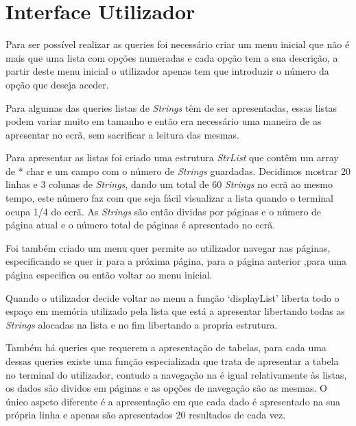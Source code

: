 \documentclass[10pt] {article}
\begin{document}
\section{Interface Utilizador}
\par Para ser possível realizar as queries foi necessário criar um menu inicial que não é mais que uma lista
com opções numeradas e cada opção tem a sua descrição, a partir deste menu inicial o utilizador apenas
tem que introduzir o número da opção que deseja aceder.
\par Para algumas das queries listas de \emph{Strings} têm de ser apresentadas, essas listas podem variar
muito  em tamanho e então era necessário uma maneira de as apresentar no ecrã, sem sacrificar a leitura das
mesmas.
\par Para apresentar as listas foi criado uma estrutura \emph{StrList} que contêm um array de {* char} e um campo
com o número de \emph{Strings} guardadas. Decidimos mostrar 20 linhas e 3 colunas de \emph{Strings},
dando um total de 60 \emph{Strings} no ecrã ao mesmo tempo, este número faz com que seja fácil visualizar a lista
quando o terminal ocupa 1/4 do ecrã. As \emph{Strings} são então dividas por páginas e o número de página
atual e o número total de páginas é apresentado no ecrã.
\par Foi também criado um menu quer permite ao utilizador navegar nas páginas, especificando se quer ir para a
próxima página, para a página anterior ,para uma página especifica ou então voltar ao menu inicial.
\par Quando o utilizador decide voltar ao menu a função `displayList' liberta todo o espaço em memória utilizado
pela lista que está a apresentar libertando todas as \emph{Strings} alocadas na lista e no fim libertando a propria
estrutura.
\par Também há queries que requerem a apresentação de tabelas, para cada uma dessas queries existe uma
função especializada que trata de apresentar a tabela no terminal do utilizador, contudo a navegação na é
igual relativamente às listas, os dados são dividos em páginas e as opções de navegação são as mesmas. O único
aspeto diferente é a apresentação em que cada dado é apresentado na sua própria linha e apenas são
apresentados 20 resultados de cada vez.

\newpage
\end{document}
